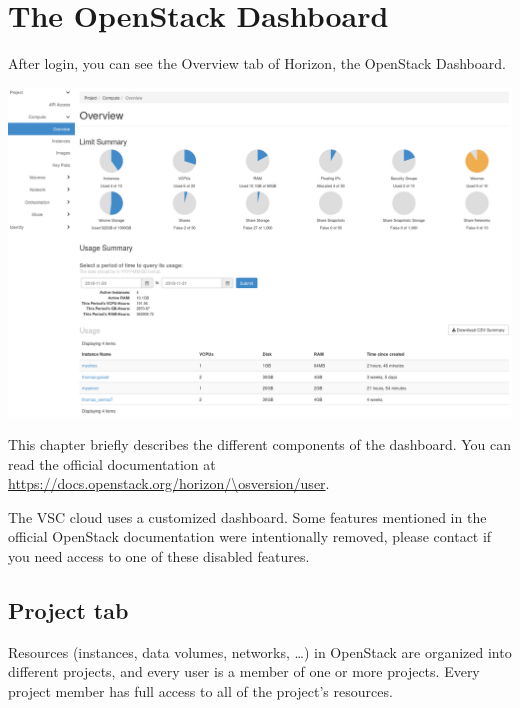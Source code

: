 \chapter{The OpenStack Dashboard}
After login, you can see the Overview tab of \gls{Horizon}, the \gls{OpenStack Dashboard}.

\begin{center}
\includegraphics[width=\textwidth]{img/tab-compute-overview.png}
\end{center}

This chapter briefly describes the different components of the
dashboard.  You can read the official documentation at
\url{https://docs.openstack.org/horizon/\osversion/user}.

 The VSC cloud uses a customized dashboard.  Some
features mentioned in the official OpenStack documentation were
intentionally removed, please contact \cloudinfo if you need access
to one of these disabled features.

\section*{Project tab}\label{sec:project-tab}
Resources (instances, data volumes, networks, \ldots) in OpenStack are
organized into different projects, and every user is a member of one
or more projects.  Every project member has full access to all of the
project's resources.

